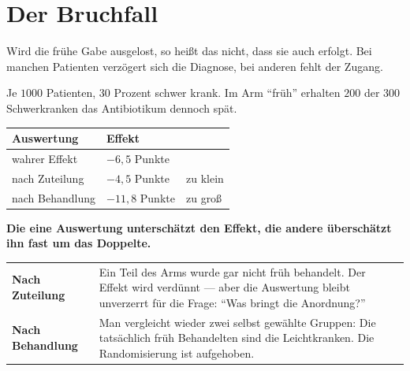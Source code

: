 \section{Der Bruchfall}

\begin{warnung}
Wird die frühe Gabe ausgelost, so heißt das nicht, dass sie auch erfolgt. Bei manchen Patienten verzögert sich die Diagnose, bei anderen fehlt der Zugang.

Je $1000$ Patienten, $30$ Prozent schwer krank. Im Arm \enquote{früh} erhalten $200$ der $300$ Schwerkranken das Antibiotikum dennoch spät.

\begin{center}
{\small
\renewcommand{\arraystretch}{1.5}
\begin{tabular}{@{}P{3.2cm}P{2.4cm}P{2.4cm}@{}}
\toprule
\textbf{Auswertung} & \textbf{Effekt} & \\
\midrule
wahrer Effekt & $-6{,}5$ Punkte & \\
nach Zuteilung & $-4{,}5$ Punkte & \textcolor{mittel}{zu klein}\\
nach Behandlung & $-11{,}8$ Punkte & \textcolor{akzent}{zu groß}\\
\bottomrule
\end{tabular}}
\end{center}

\begin{center}
\begin{minipage}{0.9\textwidth}
\textbf{Die eine Auswertung unterschätzt den Effekt, die andere überschätzt ihn fast um das Doppelte.}
\end{minipage}
\end{center}

\begin{center}
{\small
\renewcommand{\arraystretch}{1.52}
\begin{tabular}{@{}P{2.8cm}P{5.8cm}@{}}
\toprule
\textbf{Nach Zuteilung} & Ein Teil des Arms wurde gar nicht früh behandelt. Der Effekt wird verdünnt --- aber die Auswertung bleibt \textcolor{gruen}{unverzerrt} für die Frage: \enquote{Was bringt die Anordnung?}\\
\textbf{Nach Behandlung} & Man vergleicht wieder zwei selbst gewählte Gruppen: Die tatsächlich früh Behandelten sind die Leichtkranken. \textcolor{akzent}{Die Randomisierung ist aufgehoben.}\\
\bottomrule
\end{tabular}}
\end{center}


\end{warnung}

